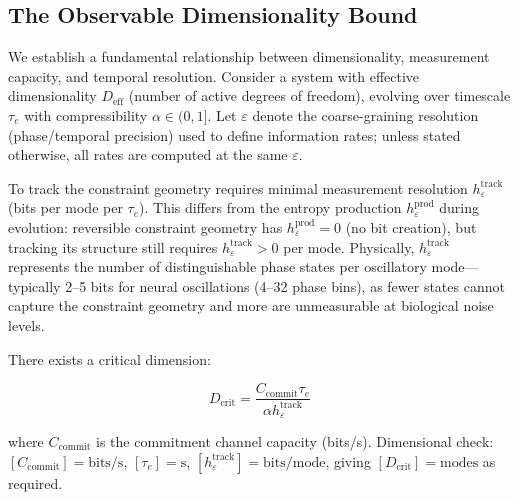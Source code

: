 \documentclass[12pt]{article}
\begin{document}
\subsection{The Observable Dimensionality Bound}

We establish a fundamental relationship between dimensionality, measurement capacity, and temporal resolution. Consider a system with effective dimensionality $D_{\text{eff}}$ (number of active degrees of freedom), evolving over timescale $\tau_e$ with compressibility $\alpha \in (0,1]$. Let $\varepsilon$ denote the coarse-graining resolution (phase/temporal precision) used to define information rates; unless stated otherwise, all rates are computed at the same $\varepsilon$.

To track the constraint geometry requires minimal measurement resolution $h_\varepsilon^{\text{track}}$ (bits per mode per $\tau_e$). This differs from the entropy production $h_\varepsilon^{\text{prod}}$ during evolution: reversible constraint geometry has $h_\varepsilon^{\text{prod}} = 0$ (no bit creation), but tracking its structure still requires $h_\varepsilon^{\text{track}} > 0$ per mode. Physically, $h_\varepsilon^{\text{track}}$ represents the number of distinguishable phase states per oscillatory mode---typically 2--5 bits for neural oscillations (4--32 phase bins), as fewer states cannot capture the constraint geometry and more are unmeasurable at biological noise levels.

There exists a critical dimension:

\begin{equation}
D_{\text{crit}} = \frac{C_{\text{commit}} \tau_e}{\alpha h_\varepsilon^{\text{track}}}
\end{equation}

where $C_{\text{commit}}$ is the commitment channel capacity (bits/s). Dimensional check: $[C_{\text{commit}}] = \text{bits/s}$, $[\tau_e] = \text{s}$, $[h_\varepsilon^{\text{track}}] = \text{bits/mode}$, giving $[D_{\text{crit}}] = \text{modes}$ as required.
\end{document}
